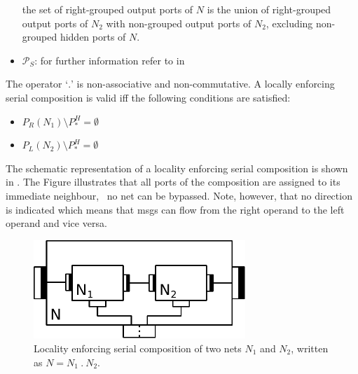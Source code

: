 \begin{definition}
\begin{itemize}
            the set of right-grouped output ports of $N$ is the union of right-grouped output ports of $N_2$ with non-grouped output ports of $N_2$, excluding non-grouped hidden ports of $N$.
        \item $\mathcal{P}_S$: for further information refer to \Def{\ref{def_smx_side}} in \Sect{\ref{sect_smx_nets_side}}
    \end{itemize}
    The operator `$.$' is non-associative and non-commutative.
    A locally enforcing serial composition is valid iff the following conditions are satisfied:
    \begin{itemize}
        \item $P_R(N_1) \setminus P_*^H = \emptyset$
        \item $P_L(N_2) \setminus P_*^H = \emptyset$
    \end{itemize}
\end{definition}

The schematic representation of a locality enforcing serial composition is shown in \Fig{\ref{fig_smx_sl}}.
The Figure illustrates that all ports of the composition are assigned to its immediate neighbour, \ie~no net can be bypassed.
Note, however, that no direction is indicated which means that \glspl*{msg} can flow from the right operand to the left operand and vice versa.
\begin{figure}[bht]\begin{center}
\TopFigSpace
    \includegraphics[width=8cm]{fig/serial.pdf}
    \CaptionFigSpace
    \caption{Locality enforcing serial composition of two nets $N_1$ and $N_2$, written as $N = N_1\ .\ N_2$.}
    \label{fig_smx_sl}
\end{center}\end{figure}

